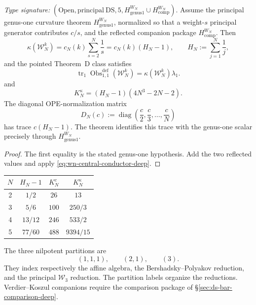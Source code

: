 \begin{proposition}
\label{prop:higher-w-kappa-matrix}
\ClaimStatusConditional
\emph{Type signature:}
\((\mathrm{Open},\mathrm{principal\ DS},5,
H_{\mathrm{genus1}}^{W_N}\cup H_{\mathrm{comp}}^{W_N})\).
Assume the principal genus-one curvature theorem
\(H_{\mathrm{genus1}}^{W_N}\), normalized so that a weight-\(s\)
principal generator contributes \(c/s\), and the reflected companion
package \(H_{\mathrm{comp}}^{W_N}\).  Then
\[
\kappa(\mathcal W_N^k)
=c_N(k)\sum_{s=2}^{N}\frac1s
=c_N(k)(H_N-1),
\qquad
H_N:=\sum_{j=1}^{N}\frac1j,
\]
and the pointed Theorem~D class satisfies
\[
 \operatorname{tr}_1
 \operatorname{Obs}^{\mathrm{def}}_{1,1}(\mathcal W_N^k)
 =\kappa(\mathcal W_N^k)\lambda_1.
\]
and
\begin{equation}
\label{eq:wn-kappa-conductor-deep}
K_N^\kappa
=(H_N-1)(4N^3-2N-2).
\end{equation}
The diagonal OPE-normalization matrix
\[
D_N(c):=\operatorname{diag}\left(\frac c2,\frac c3,\ldots,\frac cN\right)
\]
has trace \(c(H_N-1)\).  The theorem identifies this trace with the
genus-one scalar precisely through
\(H_{\mathrm{genus1}}^{W_N}\).
\end{proposition}

\begin{proof}
The first equality is the stated genus-one hypothesis.  Add the two
reflected values and apply
\eqref{eq:wn-central-conductor-deep}.
\end{proof}

\begin{center}
\renewcommand{\arraystretch}{1.2}
\begin{tabular}{cccc}
\toprule
\(N\) & \(H_N-1\) & \(K_N^c\) & \(K_N^\kappa\) \\
\midrule
2 & \(1/2\) & \(26\) & \(13\) \\
3 & \(5/6\) & \(100\) & \(250/3\) \\
4 & \(13/12\) & \(246\) & \(533/2\) \\
5 & \(77/60\) & \(488\) & \(9394/15\) \\
\bottomrule
\end{tabular}
\end{center}

\begin{computation}
\label{comp:sl3-ds-hierarchy}
\ClaimStatusComputed
The three nilpotent partitions are
\[
(1,1,1),\qquad(2,1),\qquad(3).
\]
They index respectively the affine algebra, the
Bershadsky--Polyakov reduction, and the principal
\(\mathcal W_3\) reduction.  The partition labels organize the
reductions.  Verdier--Koszul companions require the comparison
package of \S\ref{sec:ds-bar-comparison-deep}.
\end{computation}

